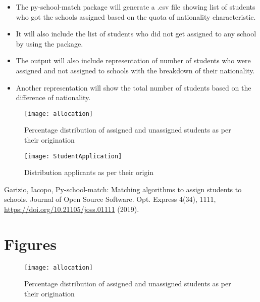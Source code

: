 \documentclass[twocolumn]{article}
\begin{document}
\begin{itemize}
    \vspace{-0.4cm}\item The py-school-match package will generate a .csv file showing list of students who got the schools assigned based on the quota of nationality characteristic.\\
    \vspace{-0.4cm}\item It will also include the list of students who did not get assigned to any school by using the package.\\
    \vspace{-0.4cm}\item The output will also include representation of number of students who were assigned and not assigned to schools with the breakdown of their nationality.\\
    \vspace{-0.4cm}\item Another representation will show the total number of students based on the difference of nationality.\\
\end{itemize}
\begin{figure}[h!]
  \centering
  \texttt{[image: allocation]}
    \caption{Percentage distribution of assigned and unassigned students as per their origination}
    \label{fig:Assigned}
\end{figure}

\begin{figure}[h!]
  \centering
  \texttt{[image: StudentApplication]}
    \caption{Distribution applicants as per their origin}
    \label{fig:Distribution}
\end{figure}
\begin{thebibliography}{1}

Garizio, Iacopo, 
  {Py-school-match: Matching algorithms to assign students to schools. Journal of Open Source Software.} Opt. Express {4(34)},
  1111, \url{https://doi.org/10.21105/joss.01111} (2019).
\end{thebibliography}
\onecolumn
\section*{Figures}

\begin{figure}[h!]
  \centering
  \texttt{[image: allocation]}
    \caption{Percentage distribution of assigned and unassigned students as per their origination}
    \label{fig:Assigned}
\end{figure}
\end{document}
